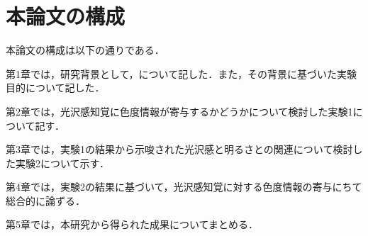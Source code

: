     \section{本論文の構成}
        本論文の構成は以下の通りである．

        第1章では，研究背景として，について記した．また，その背景に基づいた実験目的について記した．

        第2章では，光沢感知覚に色度情報が寄与するかどうかについて検討した実験1について記す．

        第3章では，実験1の結果から示唆された光沢感と明るさとの関連について検討した実験2について示す．

        第4章では，実験2の結果に基づいて，光沢感知覚に対する色度情報の寄与にちて総合的に論ずる．

        第5章では，本研究から得られた成果についてまとめる．

    \newpage
